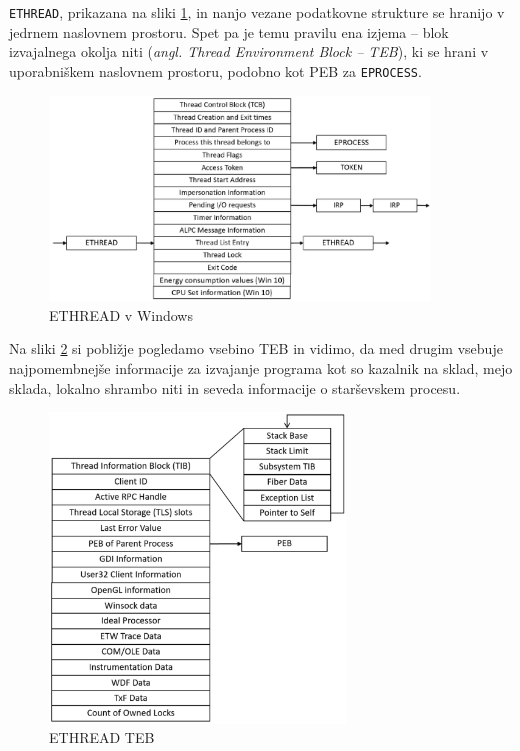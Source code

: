 \documentclass[a4paper,12pt,openright]{book}
\begin{document}
\texttt{ETHREAD}, prikazana na sliki \ref{fig:windows_ethread}, in nanjo vezane podatkovne strukture se hranijo v jedrnem naslovnem prostoru.
Spet pa je temu pravilu ena izjema -- blok izvajalnega okolja niti (\textit{angl. Thread Environment Block -- TEB}), ki se hrani v uporabniškem naslovnem prostoru, podobno kot PEB za \texttt{EPROCESS}.

\begin{figure}[h!]
	\begin{center}
		\includegraphics[width=0.9\textwidth]{images/windows_ethread.png}
	\end{center}
	\caption{ETHREAD v Windows \cite{Yosifovich_Russinovich_Solomon_Ionescu_2017}}
	\label{fig:windows_ethread}
\end{figure}

Na sliki \ref{fig:windows_ethread_tib} si pobližje pogledamo vsebino TEB in vidimo, da med drugim vsebuje najpomembnejše informacije za izvajanje programa kot so kazalnik na sklad, mejo sklada, lokalno shrambo niti in seveda informacije o starševskem procesu.

\begin{figure}[h!]
	\begin{center}
		\includegraphics[width=0.7\textwidth]{images/windows_ethread_teb.png}
	\end{center}
	\caption{ETHREAD TEB \cite{Yosifovich_Russinovich_Solomon_Ionescu_2017}}
	\label{fig:windows_ethread_tib}
\end{figure}
\end{document}
